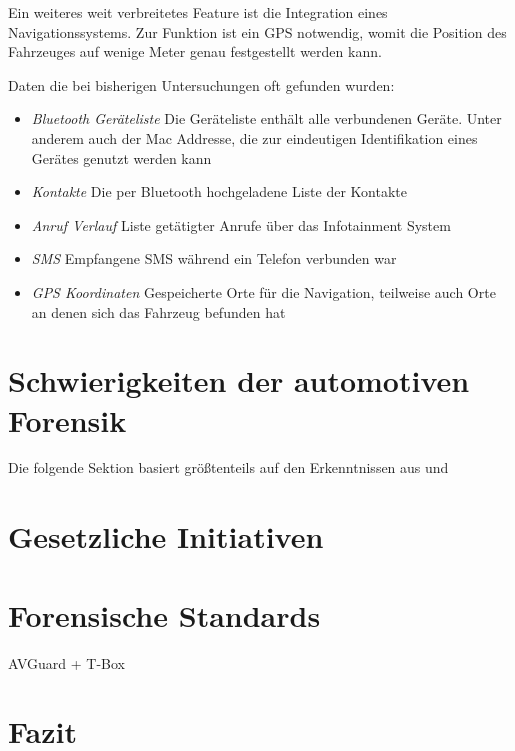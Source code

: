 \documentclass[conference,compsoc,final,a4paper]{IEEEtran}
\begin{document}
Ein weiteres weit verbreitetes Feature ist die Integration eines Navigationssystems.
Zur Funktion ist ein \ac{GPS} notwendig, womit die Position des Fahrzeuges auf wenige Meter genau festgestellt werden kann.

Daten die bei bisherigen Untersuchungen oft gefunden wurden:~\cite{Lacroix2017}
\begin{itemize}
  \item \emph{Bluetooth Geräteliste} Die Geräteliste enthält alle verbundenen Geräte. Unter anderem auch der Mac Addresse, die zur eindeutigen Identifikation eines Gerätes genutzt werden kann
  \item \emph{Kontakte} Die per Bluetooth hochgeladene Liste der Kontakte
  \item \emph{Anruf Verlauf} Liste getätigter Anrufe über das Infotainment System
  \item \emph{SMS} Empfangene SMS während ein Telefon verbunden war
  \item \emph{GPS Koordinaten} Gespeicherte Orte für die Navigation, teilweise auch Orte an denen sich das Fahrzeug befunden hat
\end{itemize}


\section{Schwierigkeiten der automotiven Forensik}

Die folgende Sektion basiert größtenteils auf den Erkenntnissen aus  und 



\section{Gesetzliche Initiativen}




\section{Forensische Standards}

AVGuard + T-Box

\section{Fazit}
\end{document}
